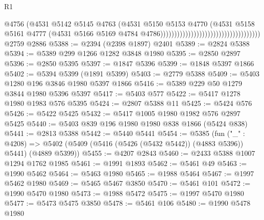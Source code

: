 \begin{lexlean}{R1}
\begin{coremodule}
                                                                    @4756
                                                                    (@4531
                                                                      @5142
                                                                      @5145
                                                                      @4763
                                                                      (@4531
                                                                        @5150
                                                                        @5153
                                                                        @4770
                                                                        (@4531
                                                                          @5158
                                                                          @5161
                                                                          @4777
                                                                          (@4531
                                                                            @5166
                                                                            @5169
                                                                            @4784
                                                                            @4786))))))))))))))))))))))))))))))))))))
    @2759
    @2886
@5388 := @2394 (@2398 @1897) @2401
@5389 := @2824 @5388
@5394 := @5389 @299 @1266 @1282 @3848 @1980
@5395 := @2850 @2897
@5396 := @2850 @5395
@5397 := @1847 @5396
@5399 := @1848 @5397 @1866
@5402 := @5394 @5399 (@1891 @5399)
@5403 := @2779 @5388
@5409 := @5403 @1280 @196 @3846 @1980 @5397 @1866
@5416 := @5389 @229 @50 @1279 @3844 @1980 @5396 @5397
@5417 := @5403 @577
@5422 := @5417 @1278 @1980 @1983 @576 @5395
@5424 := @2807 @5388 @11
@5425 := @5424 @576
@5426 := @5422 @5425
@5432 := @5417 @1005 @1980 @1982 @576 @2897 @5425
@5440 := @5403 @839 @196 @1980 @1980 @838 @1866 (@5424 @838)
@5441 := @2813 @5388
@5442 := @5440 @5441
@5454 := @5385
    (fun ("_" : @4208) =>
    @5402 (@5409 (@5416 (@5426 (@5432 @5442)) (@4883 @5396)) @5441) (@4889 @5399))
@5455 := @4207 @2843
@5460 := @2433 @5388 @1007 @1294 @1762 @1985
@5461 := @1991 @1893
@5462 := @5461 @49
@5463 := @1990 @5462
@5464 := @5463 @1980
@5465 := @1988 @5464
@5467 := @1997 @5462 @1980
@5469 := @5465 @5467 @3850
@5470 := @5461 @101
@5472 := @1990 @5470 @1980
@5473 := @1988 @5472
@5475 := @1997 @5470 @1980
@5477 := @5473 @5475 @3850
@5478 := @5461 @106
@5480 := @1990 @5478 @1980

\end{coremodule}
\end{lexlean}
